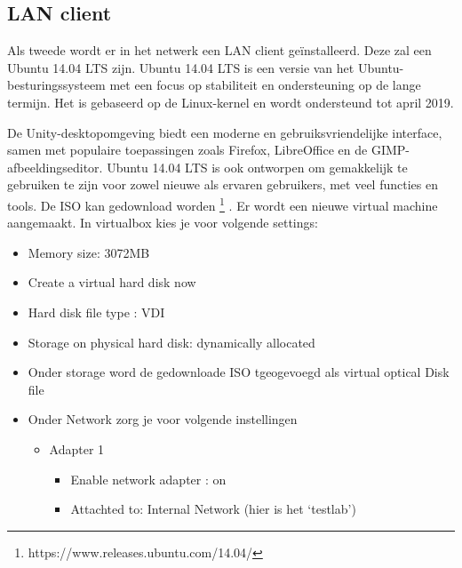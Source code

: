 \subsection{LAN client}
Als tweede wordt er in het netwerk een LAN client geïnstalleerd. Deze zal een Ubuntu 14.04 LTS zijn. Ubuntu 14.04 LTS is een versie van het \newline Ubuntu-besturingssysteem met een focus op stabiliteit en ondersteuning op de lange termijn. Het is gebaseerd op de Linux-kernel en wordt ondersteund tot april 2019. 
\newline

De Unity-desktopomgeving biedt een moderne en gebruiksvriendelijke interface, samen met populaire toepassingen zoals Firefox, LibreOffice en \newline de GIMP-afbeeldingseditor. Ubuntu 14.04 LTS is ook ontworpen om gemakkelijk te gebruiken te zijn voor zowel nieuwe als ervaren gebruikers, met veel functies en tools. De ISO kan gedownload worden \footnote{https://www.releases.ubuntu.com/14.04/} . Er wordt een nieuwe virtual machine aangemaakt.
In virtualbox kies je voor volgende settings:
\begin{itemize}
    \item Memory size: 3072MB 
    \item Create a virtual hard disk now
    \item Hard disk file type : VDI
    \item Storage on physical hard disk: dynamically allocated
    \item Onder storage word de gedownloade ISO tgeogevoegd als virtual optical Disk file
    \item Onder Network zorg je voor volgende instellingen
    \begin{itemize}
        \item Adapter 1
        \begin{itemize}
            \item Enable network adapter : on
            \item Attachted to: Internal Network (hier is het ‘testlab’)
            
        \end{itemize}
    \end{itemize}
    
    
\end{itemize}

